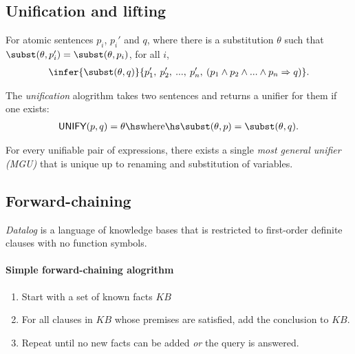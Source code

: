 \documentclass{article}
\begin{document}
\subsection{Unification and lifting}

\begin{theorem}
	For atomic sentences $p_i$, $p_i'$ and $q$, where there is a substitution
	$\theta$ such that $\subst(\theta,p_i')=\subst(\theta,p_i)$, for
	all $i$,
	\begin{align*}
		\infer{\subst(\theta,q)}{p_1',\: p_2',\: ...,\: p_n',\:(p_1\wedge p_2 \wedge ... \wedge p_n\Rightarrow q)}.
	\end{align*}
\end{theorem}

\begin{definition}[R\&N p. 326]
	The \emph{unification} alogrithm takes two sentences and returns a unifier
	for them if one exists:
	\begin{align*}
		\textsf{UNIFY}(p,q)=\theta \hs\text{where}\hs \subst(\theta,p)=\subst(\theta,q).
	\end{align*}
\end{definition}

\begin{theorem}[R\&N p. 327]
	For every unifiable pair of expressions, there exists a single \emph{most general
		unifier (MGU)} that is unique up to renaming and substitution of variables.
\end{theorem}

\subsection{Forward-chaining}

\begin{definition}[R\&N p. 331]
	\emph{Datalog} is a language of knowledge bases that is restricted to first-order
	definite clauses with no function symbols.
\end{definition}

\paragraph{Simple forward-chaining alogrithm}

\begin{enumerate}
	\item Start with a set of known facts $KB$
	\item For all clauses in $KB$ whose premises are satisfied, add the conclusion to $KB$.
	\item Repeat until no new facts can be added \emph{or} the query is answered.
\end{enumerate}
\end{document}
